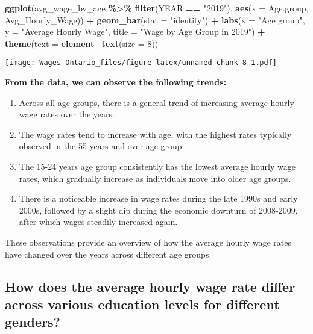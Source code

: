 \documentclass[
]{article}
\newenvironment{Shaded}{\begin{snugshade}}{\end{snugshade}}
\newcommand{\AttributeTok}[1]{\textcolor[rgb]{0.13,0.29,0.53}{#1}}
\newcommand{\DecValTok}[1]{\textcolor[rgb]{0.00,0.00,0.81}{#1}}
\newcommand{\FunctionTok}[1]{\textcolor[rgb]{0.13,0.29,0.53}{\textbf{#1}}}
\newcommand{\NormalTok}[1]{#1}
\newcommand{\SpecialCharTok}[1]{\textcolor[rgb]{0.81,0.36,0.00}{\textbf{#1}}}
\newcommand{\StringTok}[1]{\textcolor[rgb]{0.31,0.60,0.02}{#1}}
\providecommand{\tightlist}{%
  \setlength{\itemsep}{0pt}\setlength{\parskip}{0pt}}
\begin{document}
\begin{Shaded}
\begin{Highlighting}[]
\FunctionTok{ggplot}\NormalTok{(avg\_wage\_by\_age }\SpecialCharTok{\%\textgreater{}\%} \FunctionTok{filter}\NormalTok{(YEAR }\SpecialCharTok{==} \StringTok{"2019"}\NormalTok{),}
       \FunctionTok{aes}\NormalTok{(}\AttributeTok{x =}\NormalTok{ Age.group, Avg\_Hourly\_Wage)) }\SpecialCharTok{+}
  \FunctionTok{geom\_bar}\NormalTok{(}\AttributeTok{stat =} \StringTok{"identity"}\NormalTok{) }\SpecialCharTok{+}
  \FunctionTok{labs}\NormalTok{(}\AttributeTok{x =} \StringTok{"Age group"}\NormalTok{,}
       \AttributeTok{y =} \StringTok{"Average Hourly Wage"}\NormalTok{,}
       \AttributeTok{title =} \StringTok{"Wage by Age Group in 2019"}\NormalTok{) }\SpecialCharTok{+}
  \FunctionTok{theme}\NormalTok{(}\AttributeTok{text =} \FunctionTok{element\_text}\NormalTok{(}\AttributeTok{size =} \DecValTok{8}\NormalTok{))}
\end{Highlighting}
\end{Shaded}

\texttt{[image: Wages-Ontario\_files/figure-latex/unnamed-chunk-8-1.pdf]}

\textbf{From the data, we can observe the following trends:}

\begin{enumerate}
\def\labelenumi{\arabic{enumi}.}
\tightlist
\item
  Across all age groups, there is a general trend of increasing average
  hourly wage rates over the years.
\item
  The wage rates tend to increase with age, with the highest rates
  typically observed in the 55 years and over age group.
\item
  The 15-24 years age group consistently has the lowest average hourly
  wage rates, which gradually increase as individuals move into older
  age groups.
\item
  There is a noticeable increase in wage rates during the late 1990s and
  early 2000s, followed by a slight dip during the economic downturn of
  2008-2009, after which wages steadily increased again.
\end{enumerate}

These observations provide an overview of how the average hourly wage
rates have changed over the years across different age groups.

\subsection{How does the average hourly wage rate differ across various
education levels for different
genders?}\label{how-does-the-average-hourly-wage-rate-differ-across-various-education-levels-for-different-genders}
\end{document}
